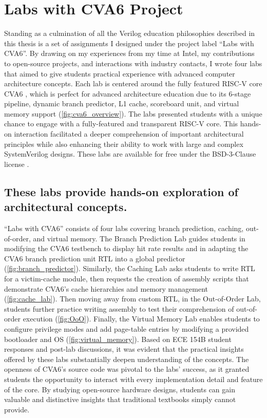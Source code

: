 
\chapter{Labs with CVA6 Project}
\label{chapter:labs_with_cva6}



Standing as a culmination of all the Verilog education philosophies described in this thesis is a set of assignments I designed under the project label \enquote{Labs with CVA6}. By drawing on my experiences from my time at Intel, my contributions to open-source projects, and interactions with industry contacts, I wrote four labs that aimed to give students practical experience with advanced computer architecture concepts. Each lab is centered around the fully featured RISC-V core CVA6 \cite{cva6}, which is perfect for advanced architecture education due to its 6-stage pipeline, dynamic branch predictor, L1 cache, scoreboard unit, and virtual memory support (\autoref{fig:cva6_overview}). The labs presented students with a unique chance to engage with a fully-featured and transparent RISC-V core. This hands-on interaction facilitated a deeper comprehension of important architectural principles while also enhancing their ability to work with large and complex SystemVerilog designs. These labs are available for free under the BSD-3-Clause license \cite{labsWithCVA6}.

\FloatBarrier

\section{These labs provide hands-on exploration of architectural concepts.}






\enquote{Labs with CVA6} consists of four labs covering branch prediction, caching, out-of-order, and virtual memory. The Branch Prediction Lab guides students in modifying the CVA6 testbench to display hit rate results and in adapting the CVA6 branch prediction unit RTL into a global predictor (\autoref{fig:branch_predictor}). Similarly, the Caching Lab asks students to write RTL for a victim-cache module, then requests the creation of assembly scripts that demonstrate CVA6's cache hierarchies and memory management (\autoref{fig:cache_lab}). Then moving away from custom RTL, in the Out-of-Order Lab, students further practice writing assembly to test their comprehension of out-of-order execution (\autoref{fig:OoO}). Finally, the Virtual Memory Lab enables students to configure privilege modes and add page-table entries by modifying a provided bootloader and OS (\autoref{fig:virtual_memory}). Based on ECE 154B student responses and post-lab discussions, it was evident that the practical insights offered by these labs substantially deepen understanding of the concepts. The openness of CVA6's source code was pivotal to the labs' success, as it granted students the opportunity to interact with every implementation detail and feature of the core. By studying open-source hardware designs, students can gain valuable and distinctive insights that traditional textbooks simply cannot provide.

